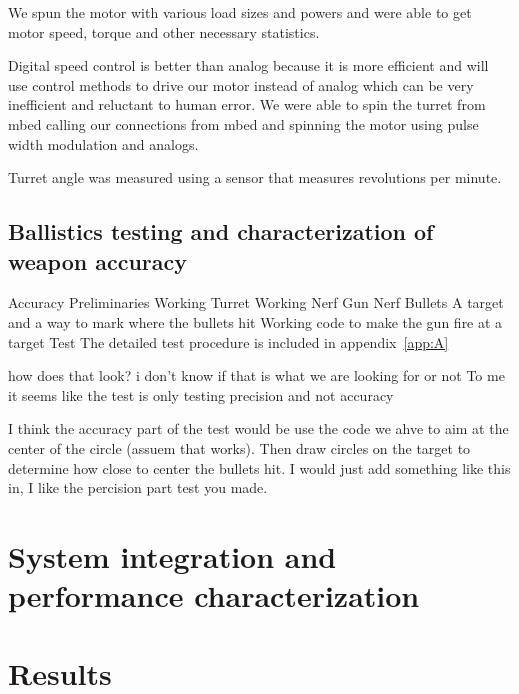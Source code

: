 \documentclass{article}
\begin{document}
We spun the motor with various load sizes and powers and were able to get motor speed, torque and other necessary statistics.

Digital speed control is better than analog because it is more efficient and will use control methods to drive our motor instead of analog which can be very inefficient and reluctant to human error. We were able to spin the turret from mbed calling our connections from mbed and spinning the motor using pulse width modulation and analogs. 

Turret angle was measured using a sensor that measures revolutions per minute. 








\subsection{Ballistics testing and characterization of weapon accuracy}

Accuracy
	Preliminaries
	Working Turret
	Working Nerf Gun
	Nerf Bullets
	A target and a way to mark where the bullets hit
Working code to make the gun fire at a target
Test
The detailed test procedure is included in appendix~\ref{app:A}

how does that look? i don’t know if that is what we are looking for or not
To me it seems like the test is only testing precision and not accuracy

	I think the accuracy part of the test would be use the code we ahve to aim at the center of the circle (assuem that works). Then draw circles on the target to determine how close to center the bullets hit. I would just add something like this in, I like the percision part test you made.





\section{System integration and performance characterization}
\section{Results}
\end{document}
